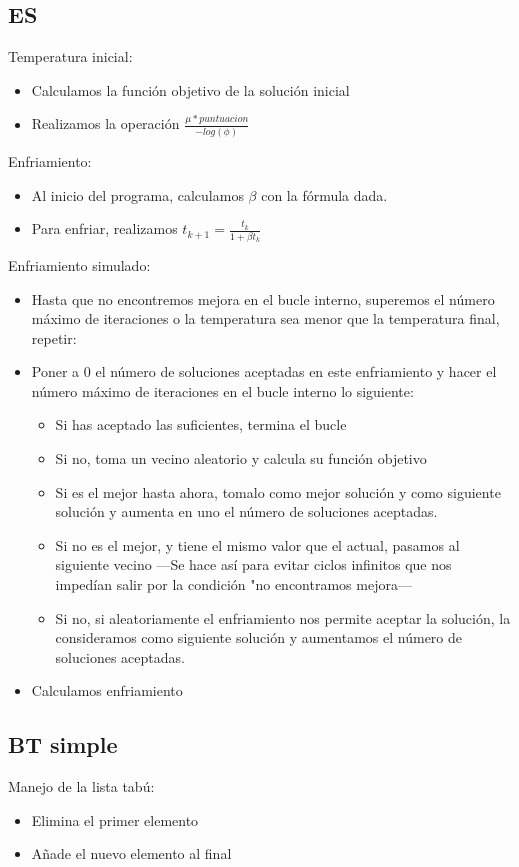 \subsection{ES}
Temperatura inicial:
\begin{itemize}
\item Calculamos la función objetivo de la solución inicial
\item Realizamos la operación $\frac{\mu * puntuacion}{-log(\phi)}$
\end{itemize}
Enfriamiento:
\begin{itemize}
\item Al inicio del programa, calculamos $\beta$ con la fórmula dada.
\item Para enfriar, realizamos $t_{k+1} = \frac{t_{k}}{1+\beta t_{k}}$
\end{itemize}
Enfriamiento simulado:
\begin{itemize}
\item Hasta que no encontremos mejora en el bucle interno, superemos el número máximo de iteraciones o la temperatura sea menor que la temperatura final, repetir:
\item Poner a 0 el número de soluciones aceptadas en este enfriamiento y hacer el número máximo de iteraciones en el bucle interno lo siguiente:
\begin{itemize}
\item Si has aceptado las suficientes, termina el bucle
\item Si no, toma un vecino aleatorio y calcula su función objetivo
\item Si es el mejor hasta ahora, tomalo como mejor solución y como siguiente solución y aumenta en uno el número de soluciones aceptadas.
\item Si no es el mejor, y tiene el mismo valor que el actual, pasamos al siguiente vecino ---Se hace así para evitar ciclos infinitos que nos impedían salir por la condición "no encontramos mejora---
\item Si no, si aleatoriamente el enfriamiento nos permite aceptar la solución, la consideramos como siguiente solución y aumentamos el número de soluciones aceptadas.
\end{itemize}
\item Calculamos enfriamiento
\end{itemize}
\newpage
\subsection{BT simple}
Manejo de la lista tabú:
\begin{itemize}
\item Elimina el primer elemento
\item Añade el nuevo elemento al final
\end{itemize} 

